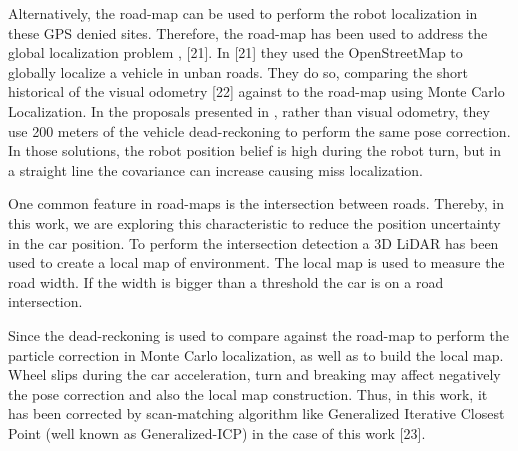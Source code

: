 Alternatively, the road-map can be used to perform the robot localization in these GPS denied sites. Therefore, the road-map has been used to address the global localization problem \cite{guivant2007global,guivant2010robust}, [21]. In [21] they used the OpenStreetMap to globally localize a vehicle in unban roads. They do so, comparing the short historical of the visual odometry [22] against to the road-map using Monte Carlo Localization. In the proposals presented in \cite{guivant2007global, guivant2010robust}, rather than visual odometry, they use 200 meters of the vehicle dead-reckoning to perform the same pose correction. In those solutions, the robot position belief is high during the robot turn, but in a straight line the covariance can increase causing miss localization. 

One common feature in road-maps is the intersection between roads. Thereby, in this work, we are exploring this characteristic to reduce the position uncertainty in the car position. To perform the intersection detection a 3D LiDAR has been used to create a local map of environment. The local map is used to measure the road width. If the width is bigger than a threshold the car is on a road intersection.

Since the dead-reckoning is used to compare against the road-map to perform the particle correction in Monte Carlo localization, as well as to build the local map. Wheel slips 
during the car acceleration, turn and breaking may affect negatively the pose correction and also the local map construction. Thus, in this work, it has been corrected by scan-matching algorithm like Generalized Iterative Closest Point (well known as Generalized-ICP) in the case of this work [23].


